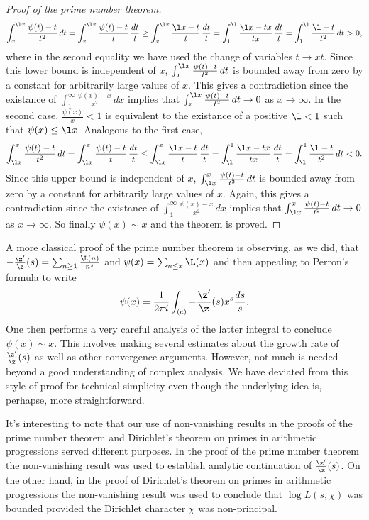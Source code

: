 \begin{proof}[Proof of the prime number theorem]
        \[
          \int_{x}^{\l x}\frac{\psi(t)-t}{t^{2}}\,dt = \int_{x}^{\l x}\frac{\psi(t)-t}{t}\,\frac{dt}{t} \ge \int_{x}^{\l x}\frac{\l x-t}{t}\,\frac{dt}{t} = \int_{1}^{\l}\frac{\l x-tx}{tx}\,\frac{dt}{t} = \int_{1}^{\l}\frac{\l-t}{t^{2}}\,dt > 0,
        \]
        where in the second equality we have used the change of variables $t \to xt$. Since this lower bound is independent of $x$, $\int_{x}^{\l x}\frac{\psi(t)-t}{t^{2}}\,dt$ is bounded away from zero by a constant for arbitrarily large values of $x$. This gives a contradiction since the existance of $\int_{1}^{\infty}\frac{\psi(x)-x}{x^{2}}\,dx$ implies that $\int_{x}^{\l x}\frac{\psi(t)-t}{t^{2}}\,dt \to 0$ as $x \to \infty$. In the second case, $\frac{\psi(x)}{x} < 1$ is equivalent to the existance of a positive $\l < 1$ such that $\psi(x) \le \l x$. Analogous to the first case,
        \[
          \int_{\l x}^{x}\frac{\psi(t)-t}{t^{2}}\,dt = \int_{\l x}^{x}\frac{\psi(t)-t}{t}\,\frac{dt}{t} \le \int_{\l x}^{x}\frac{\l x-t}{t}\,\frac{dt}{t} = \int_{\l}^{1}\frac{\l x-tx}{tx}\,\frac{dt}{t} = \int_{\l}^{1}\frac{\l-t}{t^{2}}\,dt < 0.
        \]
        Since this upper bound is independent of $x$, $\int_{\l x}^{x}\frac{\psi(t)-t}{t^{2}}\,dt$ is bounded away from zero by a constant for arbitrarily large values of $x$. Again, this gives a contradiction since the existance of $\int_{1}^{\infty}\frac{\psi(x)-x}{x^{2}}\,dx$ implies that $\int_{\l x}^{x}\frac{\psi(t)-t}{t^{2}}\,dt \to 0$ as $x \to \infty$. So finally $\psi(x) \sim x$ and the theorem is proved.
      \end{proof}

      A more classical proof of the prime number theorem is observing, as we did, that $-\frac{\z'}{\z}(s) = \sum_{n \ge 1}\frac{\L(n)}{n^{s}}$ and $\psi(x) = \sum_{n \le x}\L(x)$ and then appealing to Perron's formula to write
      \[
        \psi(x) = \frac{1}{2\pi i}\int_{(c)}-\frac{\z'}{\z}(s)x^{s}\frac{ds}{s}.
      \]
      One then performs a very careful analysis of the latter integral to conclude $\psi(x) \sim x$. This involves making several estimates about the growth rate of $\frac{\z'}{\z}(s)$ as well as other convergence arguments. However, not much is needed beyond a good understanding of complex analysis. We have deviated from this style of proof for technical simplicity even though the underlying idea is, perhapse, more straightforward.

      \begin{remark}
        It's interesting to note that our use of non-vanishing results in the proofs of the prime number theorem and Dirichlet's theorem on primes in arithmetic progressions served different purposes. In the proof of the prime number theorem the non-vanishing result was used to establish analytic continuation of $\frac{\z'}{\z}(s)$. On the other hand, in the proof of Dirichlet's theorem on primes in arithmetic progressions the non-vanishing result was used to conclude that $\log L(s,\chi)$ was bounded provided the Dirichlet character $\chi$ was non-principal.
      \end{remark}

